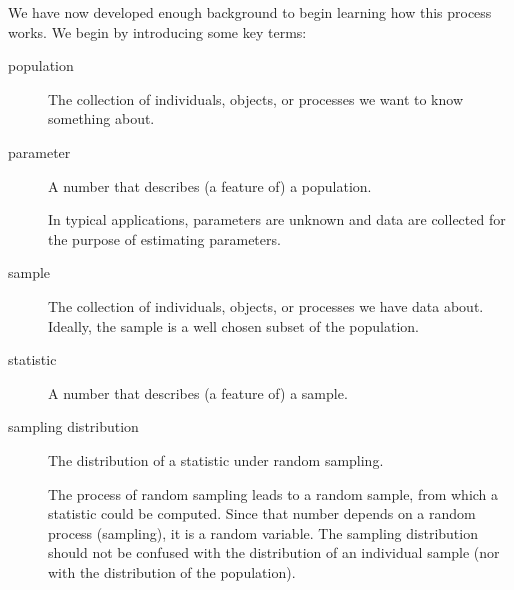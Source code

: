 \documentclass[twoside]{book}\usepackage[]{graphicx}\usepackage[]{xcolor}
\begin{document}
We have now developed enough background to begin learning how this process works. 
We begin by introducing some key terms:
\begin{description}
	\item[population] The collection of individuals, objects, or processes we want to 
		know something about.

	\item[parameter] A number that describes (a feature of) a population.

		In typical applications, parameters are unknown and data are collected
		for the purpose of estimating parameters.

	\item[sample] The collection of individuals, objects, or processes we have data
		about.  Ideally, the sample is a well chosen subset of the population.

	\item[statistic] A number that describes (a feature of) a sample.

	\item[sampling distribution] The distribution of a statistic under random sampling.

		The process of random sampling leads to a random sample, from which a statistic
		could be computed.  Since that number depends on a random process (sampling),
		it is a random variable.  The sampling distribution should not be confused
		with the distribution of an individual sample (nor with the distribution of 
		the population).

\end{description}
\end{document}
